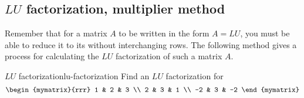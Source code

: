 \subsection{$LU$ factorization, multiplier method}

Remember that for a matrix $A$ to be written in the form $A=LU$, you must be able to reduce it to its {\ef} without interchanging rows. The following method gives a process for calculating the $LU$ factorization of such a matrix $A$.

\begin{example}{$LU$ factorization}{lu-factorization}
Find an $LU$ factorization for
\begin{equation*}
\begin{mymatrix}{rrr}
1 & 2 & 3 \\
2 & 3 & 1 \\
-2 & 3 & -2
\end{mymatrix}
\end{equation*}
\end{example}

